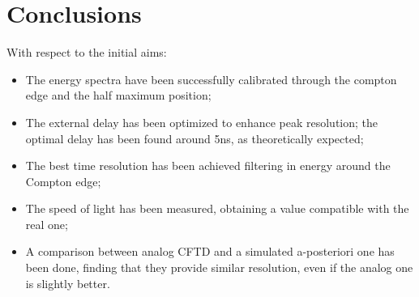 \documentclass[11pt,a4 paper]{article}
\begin{document}
\section{Conclusions}
With respect to the initial aims:
\begin{itemize}[noitemsep]
    \item The energy spectra have been successfully calibrated through the compton edge and the half maximum position;
    \item The external delay has been optimized to enhance peak resolution; the optimal delay has been found around 5ns, as theoretically expected;
    \item The best time resolution has been achieved filtering in energy around the Compton edge;
    \item The speed of light has been measured, obtaining a value compatible with the real one;
    \item A comparison between analog CFTD and a simulated a-posteriori one has been done, finding that they provide similar resolution, even if the analog one is slightly better.
\end{itemize}
\end{document}

